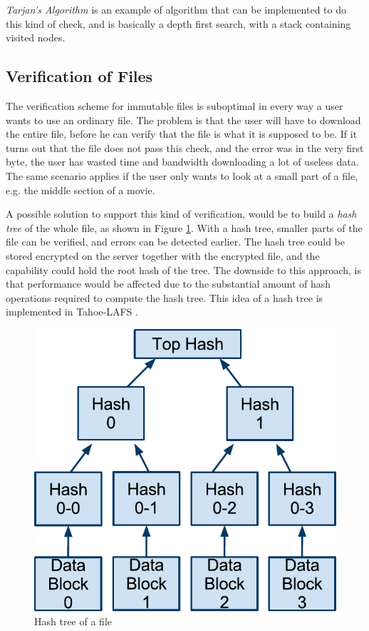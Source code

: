 \documentclass[pdftex,english,10pt,b5paper,twoside]{book}
\begin{document}
\emph{Tarjan's Algorithm} \cite{tarjan} is an example of algorithm that can be
implemented to do this kind of check, and is basically a depth first search,
with a stack containing visited nodes.

\subsection{Verification of Files}

The verification scheme for immutable files is suboptimal in every way a user
wants to use an ordinary file. The problem is that the user will have to
download the entire file, before he can verify that the file is what it is
supposed to be. If it turns out that the file does not pass this check, and the
error was in the very first byte, the user has wasted time and bandwidth
downloading a lot of useless data. The same scenario applies if the user only
wants to look at a small part of a file, e.g. the middle section of a movie.

A possible solution to support this kind of verification, would be to build a
\emph{hash tree} of the whole file, as shown in Figure \ref{fig:hashtree}. With
a hash tree, smaller parts of the file can be verified, and errors can be
detected earlier. The hash tree could be stored encrypted on the server
together with the encrypted file, and the capability could hold the root hash
of the tree. The downside to this approach, is that performance would be
affected due to the substantial amount of hash operations required to compute
the hash tree.  This idea of a hash tree is implemented in Tahoe-\ac{LAFS}
\cite{tahoe}.

\begin{figure}[!h]
\centering
\includegraphics[scale=0.55]{hash-tree.pdf}
\caption{Hash tree of a file}
\label{fig:hashtree}
\end{figure}
\end{document}
